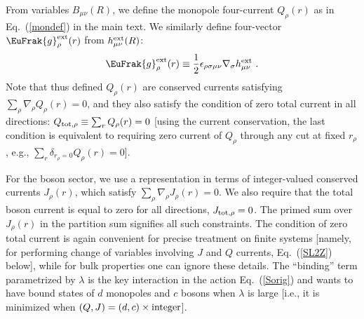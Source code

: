 \documentclass[prb,twocolumn]{revtex4-1}
\def\cJ{{J}}
\def\cQ{{Q}}
\def\hext{h^{\rm ext}}
\begin{document}
From variables $B_{\mu\nu}(R)$, we define the monopole four-current $\cQ_\rho(r)$ as in Eq.~(\ref{mondef}) in the main text.
We similarly define four-vector $\EuFrak{g}^{\rm ext}_\rho(r)$ from $\hext_{\mu\nu}(R)$:
\begin{equation}
\EuFrak{g}^{\rm ext}_\rho(r) \equiv  \frac{1}{2} \epsilon_{\rho\sigma\mu\nu} \nabla_\sigma \hext_{\mu\nu} ~.
\end{equation}
Note that thus defined $\cQ_\rho(r)$ are conserved currents satisfying $\sum_\rho \nabla_\rho \cQ_\rho(r) = 0$, and they also satisfy the condition of zero total current in all directions: $\cQ_{{\rm tot}, \rho} \equiv \sum_r \cQ_\rho(r) = 0$ [using the current conservation, the last condition is equivalent to requiring zero current of $\cQ_\rho$ through any cut at fixed $r_\rho$, e.g., $\sum_r \delta_{r_\rho = 0} \cQ_\rho(r) = 0$].

For the boson sector, we use a representation in terms of integer-valued conserved currents $\cJ_\rho(r)$, which satisfy $\sum_\rho \nabla_\rho \cJ_\rho(r) = 0$.  We also require that the total boson current is equal to zero for all directions, $\cJ_{{\rm tot}, \rho} = 0$.  The primed sum over $\cJ_\rho(r)$ in the partition sum signifies all such constraints.  The condition of zero total current is again convenient for precise treatment on finite systems [namely, for performing change of variables involving $\cJ$ and $\cQ$ currents, Eq.~(\ref{SL2Z}) below], while for bulk properties one can ignore these details.  The ``binding'' term parametrized by $\lambda$ is the key interaction in the action Eq.~(\ref{Sorig}) and wants to have bound states of $d$ monopoles and $c$ bosons when $\lambda$ is large [i.e., it is minimized when $(\cQ, \cJ) = (d, c) \times {\rm integer}$].  
\end{document}
